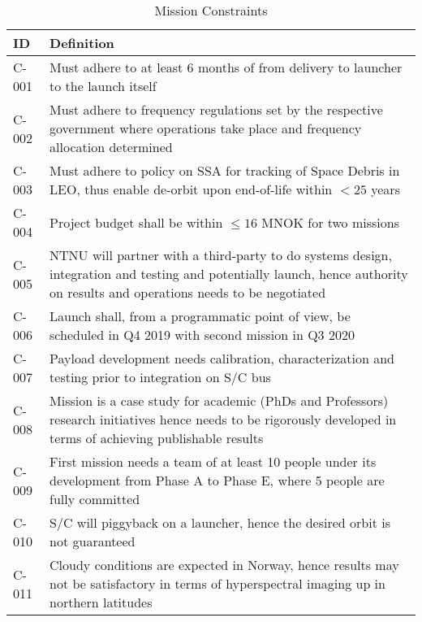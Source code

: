 \begin{table*}[htbp]
	\label{tab:constraints}
	\caption{Mission Constraints}
	\centering
		\begin{tabular}{l p{15cm}}
			\hline
		\textbf{ID}							&	\textbf{Definition}			\\ 
			\hline 															  
			C-001  & Must adhere to at least 6 months of from delivery to launcher to the launch itself  \\
			\hline
			C-002  & Must adhere to frequency regulations set by the respective government where operations take place and frequency allocation determined  \\ 
			\hline
			C-003  & Must adhere to policy on SSA for tracking of Space Debris in LEO, thus enable de-orbit upon end-of-life within $<25$ years    \\ 
			\hline	
			C-004  & Project budget shall be within $\leq 16$ MNOK for two missions    \\ 
			\hline	
			C-005  & NTNU will partner with a third-party to do systems design, integration and testing and potentially launch, hence authority on results and operations needs to be negotiated  \\ 
			\hline
			C-006  & Launch shall, from a programmatic point of view, be scheduled in Q4 2019 with second mission in Q3 2020  \\ 
			\hline
			C-007  & Payload development needs calibration, characterization and testing prior to integration on S/C bus  \\ 
			\hline
			C-008  & Mission is a case study for academic (PhDs and Professors) research initiatives hence needs to be rigorously developed in terms of achieving publishable results  \\ 
			\hline
			C-009  & First mission needs a team of at least 10 people under its development from Phase A to Phase E, where 5 people are fully committed \\ 
			\hline
			C-010  & S/C will piggyback on a launcher, hence the desired orbit is not guaranteed \\ 
			\hline
			C-011  & Cloudy conditions are expected in Norway, hence results may not be satisfactory in terms of hyperspectral imaging up in northern latitudes \\ 
			\hline
		\end{tabular}
\end{table*}